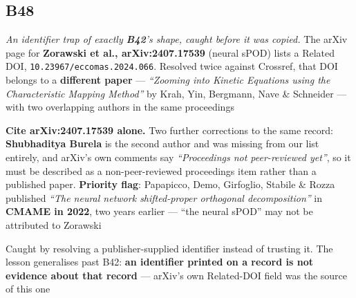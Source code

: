 \documentclass[10pt]{article}
\begin{document}
\subsection*{B48}\label{led:B48}
\begin{description}[leftmargin=0pt,itemsep=1pt]
\item[Defect.] \emph{An identifier trap of exactly \textbf{B42}'s shape, caught before it was copied.} The arXiv page for \textbf{Zorawski et al., arXiv:2407.17539} (neural sPOD) lists a Related DOI, \texttt{10.23967/eccomas.2024.066}. Resolved twice against Crossref, that DOI belongs to a \textbf{different paper} --- \emph{``Zooming into Kinetic Equations using the Characteristic Mapping Method''} by Krah, Yin, Bergmann, Nave \& Schneider --- with two overlapping authors in the same proceedings
\item[Resolution.] \textbf{Cite arXiv:2407.17539 alone.} Two further corrections to the same record: \textbf{Shubhaditya Burela} is the second author and was missing from our list entirely, and arXiv's own comments say \emph{``Proceedings not peer-reviewed yet''}, so it must be described as a non-peer-reviewed proceedings item rather than a published paper. \textbf{Priority flag}: Papapicco, Demo, Girfoglio, Stabile \& Rozza published \emph{``The neural network shifted-proper orthogonal decomposition''} in \textbf{CMAME in 2022}, two years earlier --- ``the neural sPOD'' may not be attributed to Zorawski
\item[Note.] Caught by resolving a publisher-supplied identifier instead of trusting it. The lesson generalises past B42: \textbf{an identifier printed on a record is not evidence about that record} --- arXiv's own Related-DOI field was the source of this one
\end{description}
\end{document}
